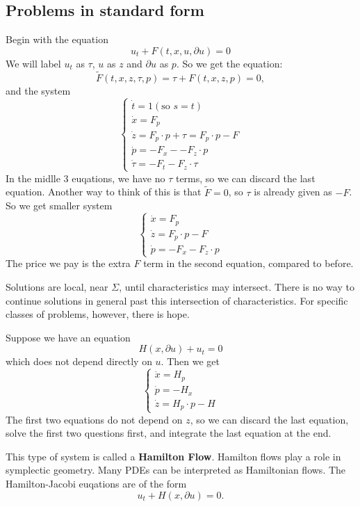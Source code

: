 \subsection{Problems in standard form}
\begin{example}
    Begin with the equation
    \[
        u_{t}+F(t, x, u, \partial u)=0
    \]
    We will label $u_t$ as $\tau$, $u$ as $z$ and $\partial u$ as $p$. So we get the equation: 
    \[
        \widetilde{F}(t, x, z, \tau, p)=\tau+F(t, x, z, p)=0,
    \]
    and the system
    \[
    \begin{cases}
        \dot t = 1 (\text{so } s = t) \\ 
        \dot x = F_p \\
        \dot z = F_p\cdot p + \tau = F_p \cdot p - F \\ 
        \dot p = -F_x -  - F_z \cdot p \\
        \dot \tau = -F_t - F_z \cdot \tau 
    \end{cases}
    \]
    In the midlle 3 euqations, we have no $\tau$ terms, so we can discard the last equation. Another way to think of this is that $\widetilde{ F} =0$, so $\tau$ is already given as $-F$. So we get smaller system 
    \[
    \begin{cases}
        \dot x = F_p \\
        \dot z = F_p\cdot p - F\\ 
        \dot p = -F_x  -F_z \cdot p
    \end{cases}
    \]
    The price we pay is the extra $F$ term in the second equation, compared to before.
\end{example}

\begin{remark}
    Solutions are local, near $\Sigma$, until characteristics may intersect. There is no way to continue solutions in general past this intersection of characteristics. For specific classes of problems, however, there is hope. 
\end{remark}

\begin{example}
    Suppose we have an equation 
    \[
        H(x, \partial u) + u_t = 0
    \]
     which does not depend directly on $u$. Then we get 
    \[
    \begin{cases}
        \dot x = H_p \\
        \dot p = -H_x \\
        \dot z  = H_p\cdot p - H
    \end{cases}
    \]
    The first two equations do not depend on $z$, so we can discard the last equation, solve the first two questions first, and integrate the last equation at the end. 

    This type of system is called a \textbf{Hamilton Flow}. Hamilton flows play a role in symplectic geometry. Many PDEs can be interpreted as Hamiltonian flows. The Hamilton-Jacobi euqations are of the form 
    \[
        u_t + H(x,\partial u) = 0.
    \]
\end{example}


